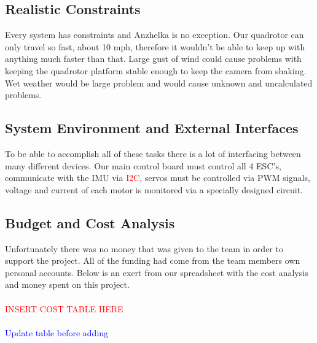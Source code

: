 \documentclass{article}
\numberwithin{equation}{section} %
\begin{document}
\subsection{Realistic Constraints}
Every system has constraints and Anzhelka is no exception. Our quadrotor can only travel so fast, about 10 mph, therefore it wouldn't be able to keep up with anything much faster than that. Large gust of wind could cause problems with keeping the quadrotor platform stable enough to keep the camera from shaking. Wet weather would be large problem and would cause unknown and uncalculated problems.

\subsection{System Environment and External Interfaces}
To be able to accomplish all of these tasks there is a lot of interfacing between many different devices. Our main control board must control all 4 ESC's, communicate with the IMU via \textcolor{red}{I2C}, servos must be controlled via PWM signals, voltage and current of each motor is monitored via a specially designed circuit.

\subsection{Budget and Cost Analysis}
Unfortunately there was no money that was given to the team in order to support the project. All of the funding had come from the team members own personal accounts. Below is an exert from our spreadsheet with the cost analysis and money spent on this project.\\ \\
\textcolor{red}{INSERT COST TABLE HERE}\\ \\
\textcolor{blue}{Update table before adding}

\end{document}
